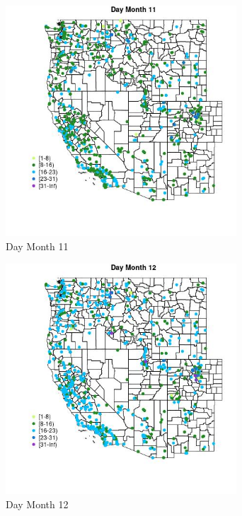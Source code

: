 \begin{figure} 
\centering  
\includegraphics[width=0.77\textwidth]{Code_Outputs/Report_ML_input_PM25_Step4_part_e_de_duplicated_aveswNAs_MapObsMo11Day.jpg} 
\caption{\label{fig:Report_ML_input_PM25_Step4_part_e_de_duplicated_aveswNAsMapObsMo11Day}Day Month 11} 
\end{figure} 
 

\begin{figure} 
\centering  
\includegraphics[width=0.77\textwidth]{Code_Outputs/Report_ML_input_PM25_Step4_part_e_de_duplicated_aveswNAs_MapObsMo12Day.jpg} 
\caption{\label{fig:Report_ML_input_PM25_Step4_part_e_de_duplicated_aveswNAsMapObsMo12Day}Day Month 12} 
\end{figure} 
 

